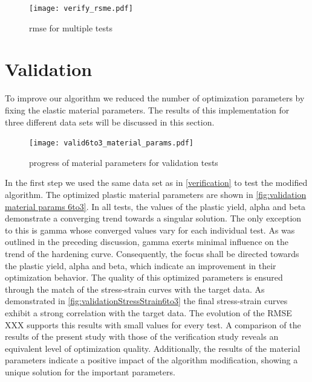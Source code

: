     \begin{figure}[H]
		\centering
        \texttt{[image: verify\_rsme.pdf]}
		\caption{rmse for multiple tests}
		\label{fig:rmse progress}
	\end{figure}

    
    \section{Validation}\label{sec: validation}
    To improve our algorithm we reduced the number of optimization parameters by fixing the elastic material parameters. The results of this implementation for three different data sets will be discussed in this section.

    \begin{figure}[H]
		\centering
        \texttt{[image: valid6to3\_material\_params.pdf]}
		\caption{progress of material parameters for validation tests}
		\label{fig:validation material params 6to3}
	\end{figure}

    In the first step we used the same data set as in \autoref{verification} to test the modified algorithm. The optimized plastic material parameters are shown in \autoref{fig:validation material params 6to3}.  In all tests, the values of the plastic yield, alpha and beta demonstrate a converging trend towards a singular solution. The only exception to this is gamma whose converged values vary for each individual test. As was outlined in the preceding discussion, gamma exerts minimal influence on the trend of the hardening curve. Consequently, the focus shall be directed towards the plastic yield, alpha and beta, which indicate an improvement in their optimization behavior.
    The quality of this optimized parameters is ensured through the match of the stress-strain curves with the target data. As demonstrated in \autoref{fig:validationStressStrain6to3} the final stress-strain curves exhibit a strong correlation with the target data. The evolution of the RMSE XXX supports this results with small values for every test. A comparison of the results of the present study with those of the verification study reveals an equivalent level of optimization quality. Additionally, the results of the material parameters indicate a positive impact of the algorithm modification, showing a unique solution for the important parameters. 
     
